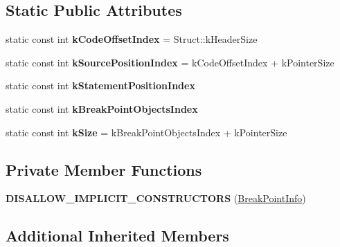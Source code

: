 \subsection*{Static Public Attributes}
\begin{DoxyCompactItemize}
\item 
static const int {\bfseries k\+Code\+Offset\+Index} = Struct\+::k\+Header\+Size\hypertarget{classv8_1_1internal_1_1_break_point_info_abd4ab7c5c4bcd23bd19941500a60cfbb}{}\label{classv8_1_1internal_1_1_break_point_info_abd4ab7c5c4bcd23bd19941500a60cfbb}

\item 
static const int {\bfseries k\+Source\+Position\+Index} = k\+Code\+Offset\+Index + k\+Pointer\+Size\hypertarget{classv8_1_1internal_1_1_break_point_info_a276bc6e4b8c20c6e1e2a9478500fc592}{}\label{classv8_1_1internal_1_1_break_point_info_a276bc6e4b8c20c6e1e2a9478500fc592}

\item 
static const int {\bfseries k\+Statement\+Position\+Index}
\item 
static const int {\bfseries k\+Break\+Point\+Objects\+Index}
\item 
static const int {\bfseries k\+Size} = k\+Break\+Point\+Objects\+Index + k\+Pointer\+Size\hypertarget{classv8_1_1internal_1_1_break_point_info_a50c4c77b2856170fe150ee0e1a1e5d28}{}\label{classv8_1_1internal_1_1_break_point_info_a50c4c77b2856170fe150ee0e1a1e5d28}

\end{DoxyCompactItemize}
\subsection*{Private Member Functions}
\begin{DoxyCompactItemize}
\item 
{\bfseries D\+I\+S\+A\+L\+L\+O\+W\+\_\+\+I\+M\+P\+L\+I\+C\+I\+T\+\_\+\+C\+O\+N\+S\+T\+R\+U\+C\+T\+O\+RS} (\hyperlink{classv8_1_1internal_1_1_break_point_info}{Break\+Point\+Info})\hypertarget{classv8_1_1internal_1_1_break_point_info_a34523e34aa1caf8b8e81a2f395cb2e0a}{}\label{classv8_1_1internal_1_1_break_point_info_a34523e34aa1caf8b8e81a2f395cb2e0a}

\end{DoxyCompactItemize}
\subsection*{Additional Inherited Members}


